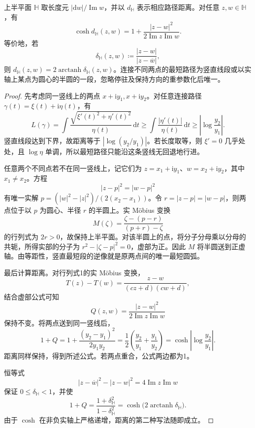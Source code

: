 \begin{proposition}[半平面距离]\label{b3:prop:13-halfplane-distance}
上半平面 \(\mathbb H\) 取长度元 \(|\mathrm dw|/\operatorname{Im}w\)，并以 \(d_{\mathbb H}\) 表示相应路径距离。对任意 \(z,w\in\mathbb H\)，有
\[
 \cosh d_{\mathbb H}(z,w)
 =1+\frac{|z-w|^2}{2\operatorname{Im}z\operatorname{Im}w}.
\]
等价地，若
\[
 \delta_{\mathbb H}(z,w)\coloneqq
 \frac{|z-w|}{|z-\overline w|},
\]
则 \(d_{\mathbb H}(z,w)=2\operatorname{arctanh}\delta_{\mathbb H}(z,w)\)。连接不同两点的最短路径为竖直线段或以实轴上某点为圆心的半圆的一段，忽略停驻及保持方向的重参数化后唯一。
\end{proposition}
\begin{proof}
先考虑同一竖线上的两点 \(x+\mathrm iy_1,x+\mathrm iy_2\)。对任意连接路径 \(\gamma(t)=\xi(t)+\mathrm i\eta(t)\)，有
\[
 L(\gamma)
 =\int\frac{\sqrt{\xi'(t)^2+\eta'(t)^2}}{\eta(t)}\,\mathrm dt
 \ge\int\frac{|\eta'(t)|}{\eta(t)}\,\mathrm dt
 \ge\left|\log\frac{y_2}{y_1}\right|.
\]
竖直线段达到下界，故距离等于 \(|\log(y_2/y_1)|\)。若长度取等，则 \(\xi'=0\) 几乎处处，且 \(\log\eta\) 单调，所以最短路径只能沿这条竖线无回退地行进。

任意两个不同点若不在同一竖线上，记它们为 \(z=x_1+\mathrm iy_1\)、\(w=x_2+\mathrm iy_2\)，其中 \(x_1\ne x_2\)。方程
\[
 |z-p|^2=|w-p|^2
\]
有唯一实解 \(p=(|w|^2-|z|^2)/(2(x_2-x_1))\)。令 \(r=|z-p|=|w-p|\)，则两点位于以 \(p\) 为圆心、半径 \(r\) 的半圆上。实 Möbius 变换
\[
 M(\zeta)=\frac{\zeta-(p-r)}{(p+r)-\zeta}
\]
的行列式为 \(2r>0\)，故保持上半平面。对该半圆上的点，将分子分母乘以分母的共轭，所得实部的分子为 \(r^2-|\zeta-p|^2=0\)，虚部为正。因此 \(M\) 将半圆送到正虚轴。由等距性，竖直最短段的逆像就是原两点间的唯一最短圆弧。

最后计算距离。对行列式1的实 Möbius 变换，
\[
 T(z)-T(w)=\frac{z-w}{(cz+d)(cw+d)},
\]
结合虚部公式可知
\[
 Q(z,w)=\frac{|z-w|^2}{2\operatorname{Im}z\operatorname{Im}w}
\]
保持不变。将两点送到同一竖线后，
\[
 1+Q
 =1+\frac{(y_2-y_1)^2}{2y_1y_2}
 =\frac12\left(\frac{y_2}{y_1}+\frac{y_1}{y_2}\right)
 =\cosh\left|\log\frac{y_2}{y_1}\right|.
\]
距离同样保持，得到所述公式。若两点重合，公式两边都为1。

恒等式
\[
 |z-\overline w|^2-|z-w|^2
 =4\operatorname{Im}z\operatorname{Im}w
\]
保证 \(0\le\delta_{\mathbb H}<1\)，并使
\[
 1+Q=\frac{1+\delta_{\mathbb H}^2}{1-\delta_{\mathbb H}^2}
 =\cosh\bigl(2\operatorname{arctanh}\delta_{\mathbb H}\bigr).
\]
由于 \(\cosh\) 在非负实轴上严格递增，距离的第二种写法随即成立。
\end{proof}

